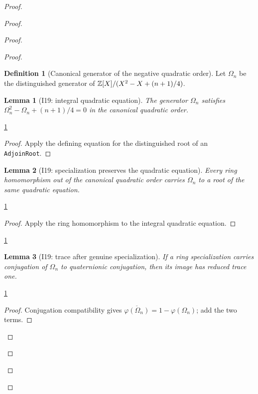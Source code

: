 \documentclass[11pt,a4paper]{article}
\numberwithin{equation}{section}
\theoremstyle{plain}\newtheorem{theorem}{Theorem}[section]\newaliascnt{proposition}{theorem}\newtheorem{proposition}[proposition]{Proposition}\aliascntresetthe{proposition}\newaliascnt{lemma}{theorem}\newtheorem{lemma}[lemma]{Lemma}\aliascntresetthe{lemma}
\theoremstyle{definition}\newaliascnt{definition}{theorem}\newtheorem{definition}[definition]{Definition}\aliascntresetthe{definition}\newaliascnt{notation}{theorem}\newtheorem{notation}[notation]{Notation}\aliascntresetthe{notation}
\providecommand{\lean}[1]{}\providecommand{\leanok}{}
\begin{document}
\begin{proof}
\begin{proof}
\begin{proof}
\begin{proof}
\begin{definition}[Canonical generator of the negative quadratic order]\label{def_i19_order_omega}\lean{SptCM.Repair.negativeQuadraticOmega}\leanok
Let $\Omega_n$ be the distinguished generator of
$\mathbb Z[X]/(X^2-X+(n+1)/4)$.
\end{definition}

\begin{lemma}[I19: integral quadratic equation]\label{lem_i19_order_omega_quadratic}\lean{SptCM.Repair.negativeQuadraticOmega_quadratic_relation}\leanok
The generator $\Omega_n$ satisfies
$\Omega_n^2-\Omega_n+(n+1)/4=0$ in the canonical quadratic order.
\end{lemma}
\begin{uses-statement}\ref{def_i19_order_omega}\end{uses-statement}
\begin{proof}
Apply the defining equation for the distinguished root of an
\texttt{AdjoinRoot}.
\end{proof}

\begin{lemma}[I19: specialization preserves the quadratic equation]\label{lem_i19_map_order_omega_quadratic}\lean{SptCM.Repair.map_negativeQuadraticOmega_quadratic_relation}\leanok
Every ring homomorphism out of the canonical quadratic order carries
$\Omega_n$ to a root of the same quadratic equation.
\end{lemma}
\begin{uses-statement}\ref{def_i19_order_omega}\end{uses-statement}
\begin{proof}
Apply the ring homomorphism to the integral quadratic equation.
\end{proof}
\begin{uses-proof}\ref{lem_i19_order_omega_quadratic}\end{uses-proof}

\begin{lemma}[I19: trace after genuine specialization]\label{lem_i19_map_order_omega_trace}\lean{SptCM.Repair.reducedTrace_map_negativeQuadraticOmega}\leanok
If a ring specialization carries conjugation of $\Omega_n$ to quaternionic
conjugation, then its image has reduced trace one.
\end{lemma}
\begin{uses-statement}\ref{def_i19_order_omega}\end{uses-statement}
\begin{proof}
Conjugation compatibility gives $\overline{\varphi(\Omega_n)}
=1-\varphi(\Omega_n)$; add the two terms.
\end{proof}


\end{proof}
\end{proof}
\end{proof}
\end{proof}
\end{document}
